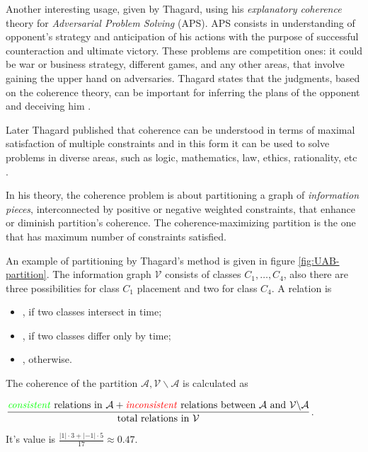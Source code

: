 Another interesting usage, given by Thagard, using his \emph{explanatory coherence}
theory for \emph{Adversarial Problem Solving} (APS).
APS consists in understanding of opponent's strategy and anticipation of his actions
with the purpose of successful counteraction and ultimate victory.
These problems are competition ones: it could be war or business strategy,
different games, and any other areas, that involve gaining the upper hand
on adversaries. Thagard states that the judgments, based on the coherence theory,
can be important for inferring the plans of the opponent and deceiving him
\cite{ThagardAPS92}.

\medskip

Later Thagard published that coherence can be understood in terms of maximal satisfaction
of multiple constraints and in this form it can be used to solve problems in
diverse areas, such as logic, mathematics, law, ethics, rationality, etc \cite{ThagVerb98}.

In his theory, the coherence problem is about partitioning a graph of
\emph{information pieces}, interconnected by positive or negative weighted
constraints, that enhance or diminish partition's coherence.
The coherence-maximizing partition is the one that has maximum number of constraints
satisfied.

An example of partitioning by Thagard's method is given in figure \ref{fig:UAB-partition}.
The information graph $\mathcal{V}$ consists of
classes $C_1,\dots,C_4$, also there are three possibilities for
class $C_1$ placement and two for class $C_4$. A relation is
\begin{itemize}[leftmargin=3cm]
  \item[\red{\emph{inconsistent}}], if two classes intersect in time;
  \item[\yellow{\emph{same class}}], if two classes differ only by time;
  \item[\green{\emph{consistent}}], otherwise.
\end{itemize}

\noindent
The coherence of the partition $\mathcal{A},\mathcal{V}\backslash\mathcal{A}$
          is calculated as
\medskip

$   \dfrac{ \text{{\color{green} \emph{consistent}} relations in } \mathcal{A}
          + \text{{\color{red} \emph{inconsistent}} relations between }
                  \mathcal{A} \text{ and } \mathcal{V}\backslash\mathcal{A}}
          {\text{total relations in } \mathcal{V}}$.
\medskip

\noindent
It's value is $\frac{|1| \cdot 3 + |-1| \cdot 5}{17} \approx 0.47$.


